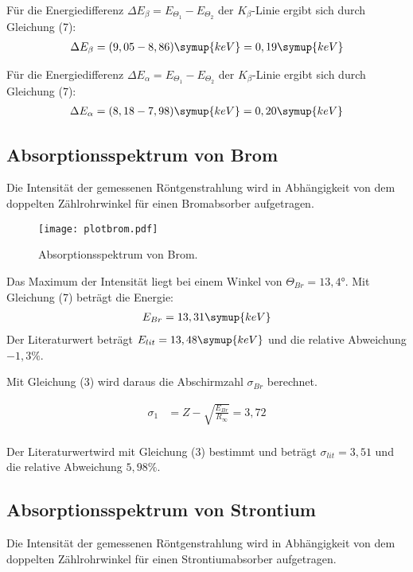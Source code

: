 Für die Energiedifferenz $\Delta E_{\beta} = E_{\Theta_1} - E_{\Theta_2}$ der $K_{\beta}$-Linie ergibt sich durch Gleichung (7):
\begin{align*}
  \Delta E_{\beta} =  (9,05 - 8,86) \symup{keV} = 0,19 \symup{keV}
\end{align*}

Für die Energiedifferenz $\Delta E_{\alpha} = E_{\Theta_1} - E_{\Theta_2}$ der $K_{\beta}$-Linie ergibt sich durch Gleichung (7):
\begin{align*}
  \Delta E_{\alpha} =  (8,18 - 7,98) \symup{keV} = 0,20 \symup{keV}
\end{align*}

\subsection{Absorptionsspektrum von Brom}

Die Intensität der gemessenen Röntgenstrahlung wird in Abhängigkeit von dem doppelten Zählrohrwinkel für
einen Bromabsorber aufgetragen.

\begin{figure}[H]
  \centering
  \texttt{[image: plotbrom.pdf]}
  \caption{Absorptionsspektrum von Brom.}
  \label{fig:plot}
\end{figure}

Das Maximum der Intensität liegt bei einem Winkel von $\Theta_{Br} = 13,4°$.
Mit Gleichung (7) beträgt die Energie:
\begin{align*}
  E_{Br} = 13,31 \symup{keV}
\end{align*}
Der Literaturwert beträgt $E_{lit} = 13,48 \symup{keV}$ \cite{sample2} und die relative Abweichung $-1,3\%$.

Mit Gleichung (3) wird daraus die Abschirmzahl $\sigma_{Br}$  berechnet.

\begin{align*}
  \sigma_1 &= Z - \sqrt{\frac{E_{Br}}{R_{\infty}}} = 3,72 \\
\end{align*}

Der Literaturwertwird mit Gleichung (3) bestimmt und beträgt $\sigma_{lit} = 3,51$ und die relative Abweichung $5,98\%$.

\subsection{Absorptionsspektrum von Strontium}

Die Intensität der gemessenen Röntgenstrahlung wird in Abhängigkeit von dem doppelten Zählrohrwinkel für
einen Strontiumabsorber aufgetragen.

